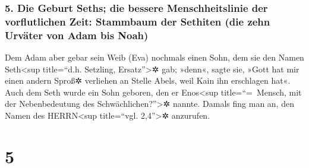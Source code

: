 \hypertarget{die-geburt-seths-die-bessere-menschheitslinie-der-vorflutlichen-zeit-stammbaum-der-sethiten-die-zehn-urvuxe4ter-von-adam-bis-noah}{%
\subsubsection{5. Die Geburt Seths; die bessere Menschheitslinie der
vorflutlichen Zeit: Stammbaum der Sethiten (die zehn Urväter von Adam
bis
Noah)}\label{die-geburt-seths-die-bessere-menschheitslinie-der-vorflutlichen-zeit-stammbaum-der-sethiten-die-zehn-urvuxe4ter-von-adam-bis-noah}}

 Dem Adam aber gebar sein Weib (Eva) nochmals einen Sohn,
dem sie den Namen Seth\textless sup title=``d.h. Setzling,
Ersatz''\textgreater✲ gab; »denn«, sagte sie, »Gott hat mir einen andern
Sproß✲ verliehen an Stelle Abels, weil Kain ihn erschlagen hat«.
 Auch dem Seth wurde ein Sohn geboren, den er
Enos\textless sup title=``=~Mensch, mit der Nebenbedeutung des
Schwächlichen?''\textgreater✲ nannte. Damals fing man an, den Namen des
HERRN\textless sup title=``vgl. 2,4''\textgreater✲ anzurufen.

\hypertarget{section-4}{%
\section{5}\label{section-4}}

